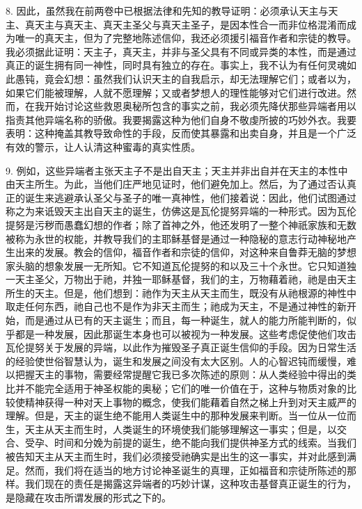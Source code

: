 8. 因此，虽然我在前两卷中已根据法律和先知的教导证明：必须承认天主与天主、真天主与真天主、真天主圣父与真天主圣子，是因本性合一而非位格混淆而成为唯一的真天主，但为了完整地陈述信仰，我还必须援引福音作者和宗徒的教导。我必须据此证明：天主子，真天主，并非与圣父具有不同或异类的本性，而是通过真正的诞生拥有同一神性，同时具有独立的存在。事实上，我不认为有任何灵魂如此愚钝，竟会幻想：虽然我们认识天主的自我启示，却无法理解它们；或者以为，如果它们能被理解，人就不愿理解；又或者梦想人的理性能够对它们进行改进。然而，在我开始讨论这些救恩奥秘所包含的事实之前，我必须先降伏那些异端者用以指责其他异端名称的骄傲。我要揭露这种为他们自身不敬虔所披的巧妙外衣。我要表明：这种掩盖其教导致命性的手段，反而使其暴露和出卖自身，并且是一个广泛有效的警示，让人认清这种蜜毒的真实性质。\par

9. 例如，这些异端者主张天主子不是出自天主；天主并非出自并在天主的本性中由天主所生。为此，当他们庄严地见证时，他们避免加上。然后，为了通过否认真正的诞生来逃避承认圣父与圣子的唯一真神性，他们接着说：因此，他们试图通过称之为来诋毁天主出自天主的诞生，仿佛这是瓦伦提努异端的一种形式。因为瓦伦提努是污秽而愚蠢幻想的作者；除了首神之外，他还发明了一整个神祇家族和无数被称为永世的权能，并教导我们的主耶稣基督是通过一种隐秘的意志行动神秘地产生出来的发展。教会的信仰，福音作者和宗徒的信仰，对这种来自鲁莽无脑的梦想家头脑的想象发展一无所知。它不知道瓦伦提努的和以及三十个永世。它只知道独一天主圣父，万物出于祂，并独一耶稣基督，我们的主，万物藉着祂，祂是由天主所生的天主。但是，他们想到：祂作为天主从天主而生，既没有从祂根源的神性中取走任何东西，祂自己也不是作为非天主而生；祂成为天主，不是通过神性的新开始，而是通过从已有的天主诞生；而且，每一种诞生，就人的能力所能判断的，似乎都是一种发展，因此那诞生本身也可以被视为一种发展。这些考虑促使他们攻击瓦伦提努关于发展的异端，以此作为摧毁圣子真正诞生信仰的手段。因为日常生活的经验使世俗智慧认为，诞生和发展之间没有太大区别。人的心智迟钝而缓慢，难以把握天主的事物，需要经常提醒它我已多次陈述的原则：从人类经验中得出的类比并不能完全适用于神圣权能的奥秘；它们的唯一价值在于，这种与物质对象的比较使精神获得一种对天上事物的概念，使我们能藉着自然之梯上升到对天主威严的理解。但是，天主的诞生绝不能用人类诞生中的那种发展来判断。当一位从一位而生，天主从天主而生时，人类诞生的环境使我们能够理解这一事实；但是，以交合、受孕、时间和分娩为前提的诞生，绝不能向我们提供神圣方式的线索。当我们被告知天主从天主而生时，我们必须接受祂确实是出生的这一事实，并对此感到满足。然而，我们将在适当的地方讨论神圣诞生的真理，正如福音和宗徒所陈述的那样。我们现在的责任是揭露这异端者的巧妙计谋，这种攻击基督真正诞生的行为，是隐藏在攻击所谓发展的形式之下的。\par

